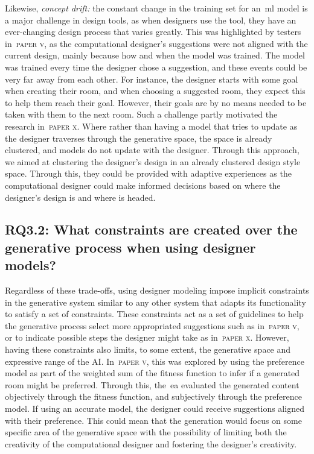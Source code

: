 Likewise, \emph{concept drift:} the constant change in the training set for an~\acrshort{ml} model is a major challenge in design tools, as when designers use the tool, they have an ever-changing design process that varies greatly. This was highlighted by testers in~\textsc{paper v}, as the computational designer's suggestions were not aligned with the current design, mainly because how and when the model was trained. The model was trained every time the designer chose a suggestion, and these events could be very far away from each other. For instance, the designer starts with some goal when creating their room, and when choosing a suggested room, they expect this to help them reach their goal. However, their goals are by no means needed to be taken with them to the next room. Such a challenge partly motivated the research in~\textsc{paper x}. Where rather than having a model that tries to update as the designer traverses through the generative space, the space is already clustered, and models do not update with the designer. Through this approach, we aimed at clustering the designer's design in an already clustered design style space. Through this, they could be provided with adaptive experiences as the computational designer could make informed decisions based on where the designer's design is and where is headed. 

\subsection[Research Question 3.2]{RQ3.2: What constraints are created over the generative process when using designer models?}

Regardless of these trade-offs, using designer modeling impose implicit constraints in the generative system similar to any other system that adapts its functionality to satisfy a set of constraints. These constraints act as a set of guidelines to help the generative process select more appropriated suggestions such as in~\textsc{paper v}, or to indicate possible steps the designer might take as in~\textsc{paper x}. However, having these constraints also limits, to some extent, the generative space and expressive range of the AI. In~\textsc{paper v}, this was explored by using the preference model as part of the weighted sum of the fitness function to infer if a generated room might be preferred. Through this, the~\acrshort{ea} evaluated the generated content objectively through the fitness function, and subjectively through the preference model. If using an accurate model, the designer could receive suggestions aligned with their preference. This could mean that the generation would focus on some specific area of the generative space with the possibility of limiting both the creativity of the computational designer and fostering the designer's creativity.

